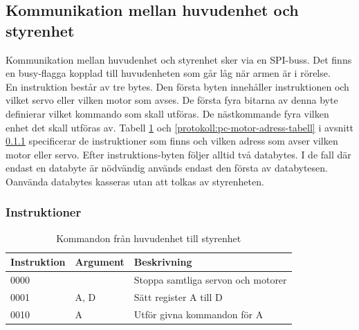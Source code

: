 \subsection{Kommunikation mellan huvudenhet och styrenhet} \label{protokoll:pc-motor}
Kommunikation mellan huvudenhet och styrenhet sker via en SPI-buss. Det finns en busy-flagga kopplad till huvudenheten som går låg när armen är i rörelse. \\
En instruktion består av tre bytes. Den första byten innehåller instruktionen och vilket servo eller vilken motor som avses. De första fyra bitarna av denna byte definierar vilket kommando som skall utföras. De nästkommande fyra vilken enhet det skall utföras av. Tabell \ref{protokoll:pc-motor-tabell} och \ref{protokoll:pc-motor-adress-tabell} i avsnitt \ref{designspec:protokoll-pc-motor-instr} specificerar de instruktioner som finns och vilken adress som avser vilken motor eller servo. Efter instruktions-byten följer alltid två databytes. I de fall där endast en databyte är nödvändig används endast den första av databytesen. Oanvända databytes kasseras utan att tolkas av styrenheten.

\subsubsection{Instruktioner} \label{designspec:protokoll-pc-motor-instr}

\begin{table}[H]
	\centering
		\begin{tabularx}{\textwidth}{| l | l | X |}
			\hline
			\textbf{Instruktion} & \textbf{Argument} & \textbf{Beskrivning} \\
			\hline
			{0000} & {} & {Stoppa samtliga servon och motorer} \\
			\hline
			{0001} & {A, D} & {Sätt register A till D} \\
			\hline
			{0010} & {A} & {Utför givna kommandon för A} \\
			\hline
		\end{tabularx}
	\caption{Kommandon från huvudenhet till styrenhet} \label{protokoll:pc-motor-tabell}
\end{table}

